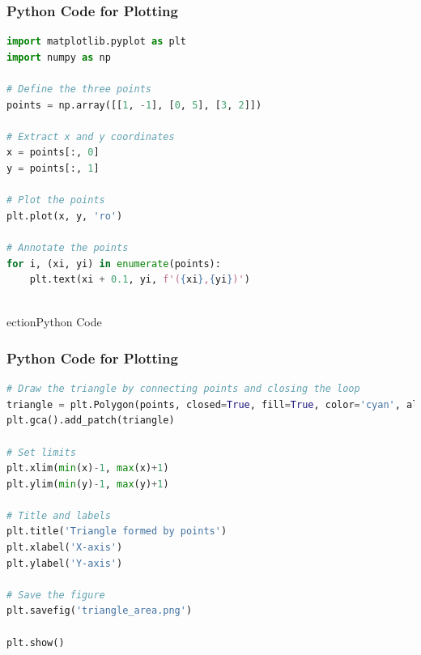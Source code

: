 \documentclass{beamer}
\theoremstyle{remark}
\numberwithin{equation}{section}
\begin{document}
\begin{frame}[fragile]
\frametitle{Python Code for Plotting}
\begin{lstlisting}[language=Python]
import matplotlib.pyplot as plt
import numpy as np

# Define the three points
points = np.array([[1, -1], [0, 5], [3, 2]])

# Extract x and y coordinates
x = points[:, 0]
y = points[:, 1]

# Plot the points
plt.plot(x, y, 'ro')

# Annotate the points
for i, (xi, yi) in enumerate(points):
    plt.text(xi + 0.1, yi, f'({xi},{yi})')



\end{lstlisting}

\end{frame}
\s                                                                    ection{Python Code}
\begin{frame}[fragile]
\frametitle{Python Code for Plotting}
\begin{lstlisting}[language=Python]   
# Draw the triangle by connecting points and closing the loop
triangle = plt.Polygon(points, closed=True, fill=True, color='cyan', alpha=0.3)
plt.gca().add_patch(triangle)

# Set limits
plt.xlim(min(x)-1, max(x)+1)
plt.ylim(min(y)-1, max(y)+1)

# Title and labels
plt.title('Triangle formed by points')
plt.xlabel('X-axis')
plt.ylabel('Y-axis')

# Save the figure
plt.savefig('triangle_area.png')

plt.show()
\end{lstlisting}

\end{frame}
\end{document}
